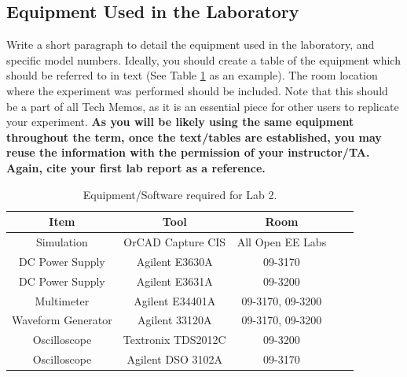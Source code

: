 \documentclass[11pt]{article}
\begin{document}
\subsection{Equipment Used in the Laboratory}
Write a short paragraph to detail the equipment used in the laboratory, and specific model numbers. Ideally, you should create a table of the equipment which should be referred to in text (See Table \ref{Table:Equipment} as an example).  The room location where the experiment was performed should be included.  Note that this should be a part of all Tech Memos, as it is an essential piece for other users to replicate your experiment.  \textbf{As you will be likely using the same equipment throughout the term, once the text/tables are established, you may reuse the information with the permission of your instructor/TA. Again, cite your first lab report as a reference.}

\begin{table}[H]
	\centering
	\caption{Equipment/Software required for Lab 2.}
	\label{Table:Equipment}
	\begin{tabular}{|c||c|c|c|c|}
		\hline
		Item & Tool & Room      \\
		\hline
		Simulation & OrCAD Capture CIS & All Open EE Labs   \\	 
		\hline 
		DC Power Supply&  Agilent E3630A  & 09-3170   \\	
		\hline  
		DC Power Supply & Agilent E3631A   & 09-3200 \\ 
		\hline 
		Multimeter & Agilent E34401A   & 09-3170, 09-3200 \\ 
		\hline 
		Waveform Generator & Agilent 33120A & 09-3170, 09-3200 \\
		\hline
		Oscilloscope & Textronix TDS2012C & 09-3200  \\
		\hline
		Oscilloscope & Agilent DSO 3102A & 09-3170  \\
		\hline
	\end{tabular}
\end{table}
\end{document}
